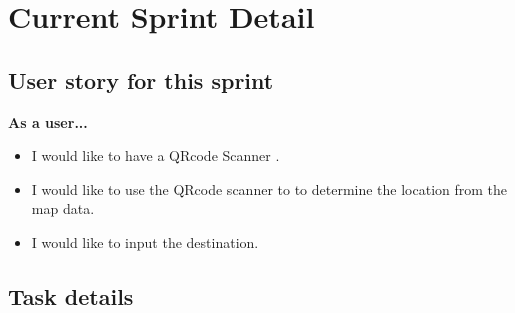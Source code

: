 \documentclass[12pt]{article}
\begin{document}
\section{Current Sprint Detail}

\subsection{User story for this sprint}

\textbf{As a user...}
\begin{itemize}
\item I would like to have a QR­code Scanner .
\item I would like to use the QR­code scanner to to determine the location from the map data.
\item I would like to input the destination.

\end{itemize}

\subsection{Task details}



\end{document}
